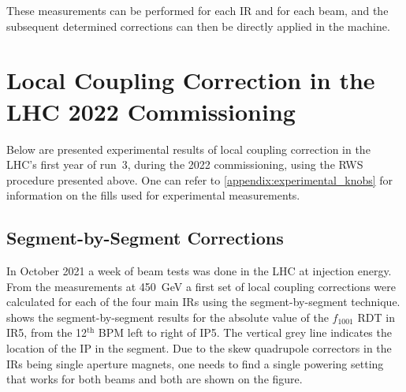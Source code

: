 These measurements can be performed for each IR and for each beam, and the subsequent determined corrections can then be directly applied in the machine.

\section{Local Coupling Correction in the LHC 2022 Commissioning}
\label{section:rws_experimental_results}

Below are presented experimental results of local coupling correction in the \acrshort{LHC}'s first year of \Gls{run}~\num{3}, during the \num{2022} commissioning, using the \gls{RWS} procedure presented above.
One can refer to \cref{appendix:experimental_knobs} for information on the fills used for experimental measurements.

\subsection{Segment-by-Segment Corrections}
\label{subsection:sbs_corrections}

In October \num{2021} a week of beam tests was done in the LHC at injection energy.
From the measurements at \qty{450}{\giga\electronvolt} a first set of local coupling corrections were calculated for each of the four main \glspl{IR} using the segment-by-segment technique.
 shows the segment-by-segment results for the absolute value of the \(f_{1001}\) \gls{RDT} in IR\num{5}, from the \num{12}\({}^\mathrm{th}\) BPM left to right of IP\num{5}.
The vertical grey line indicates the location of the IP in the segment.
Due to the \gls{skew} quadrupole correctors in the IRs being single aperture magnets, one needs to find a single powering setting that works for both beams and both are shown on the figure.

